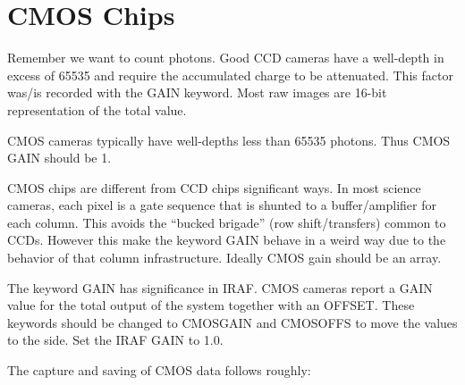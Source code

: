 \renewcommand{\footerfilename}{CMOS.tex}

\section{CMOS Chips}  \label{section:CMOSChips}

Remember we want to count photons. Good CCD cameras have a well-depth in excess
of 65535 and require the accumulated charge to be attenuated. This factor
was/is recorded with the GAIN keyword. Most raw images are 16-bit representation
of the total value.

CMOS cameras typically have well-depths less than 65535 photons. Thus CMOS
GAIN should be 1.

CMOS chips are different from CCD chips significant ways. In most science cameras,
each pixel is a gate sequence that is shunted to a buffer/amplifier for each column.
This avoids the ``bucked brigade'' (row shift/transfers) common to CCDs. However
this make the keyword GAIN behave in a weird way due to the behavior of that
column infrastructure. Ideally CMOS gain should be an array.

The keyword GAIN   has significance in IRAF.
CMOS cameras report a GAIN value for the total output of the system together with
an OFFSET. These keywords should be changed to CMOSGAIN and CMOSOFFS to move
the values to the side. Set the IRAF GAIN to 1.0.

The capture and saving of CMOS data follows roughly:

